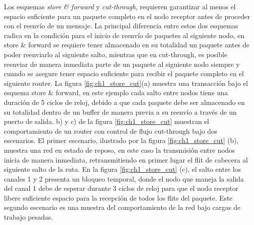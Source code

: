 Los esquemas \textit{store \& forward} y \textit{cut-through}, requieren garantizar al menos el espacio suficiente para un paquete completo en el nodo receptor antes de proceder con el reenvío de un mensaje. La principal diferencia entre estos dos esquemas radica en la condición para el inicio de reenvío de paquetes al siguiente nodo, en store \& forward se requiere tener almacenado en su totalidad un paquete antes de poder reenviarlo al siguiente salto, mientras que en cut-through, es posible reenviar de manera inmediata parte de un paquete al siguiente nodo siempre y cuando se asegure tener espacio suficiente para recibir el paquete completo en el siguiente router. La figura \ref{fig:ch1_store_cut}(a) muestra una transacción bajo el esquema store \& forward, en este ejemplo cada salto entre nodos tiene una duración de 5 ciclos de reloj, debido a que cada paquete debe ser almacenado en su totalidad dentro de un buffer de manera previa a su reenvío a través de un puerto de salida.  b) y c) de la figura \ref{fig:ch1_store_cut} muestran el comportamiento de un router con control de flujo cut-through bajo dos escenarios. El primer escenario, ilustrado por la figura \ref{fig:ch1_store_cut} (b), muestra una red en estado de reposo, en este caso la transmisión entre nodos inicia de manera inmediata, retransmitiendo en primer lugar el flit de cabecera al siguiente salto de la ruta. En la figura \ref{fig:ch1_store_cut} (c), el salto entre los canales 1 y 2 presenta un bloqueo temporal, donde el nodo que maneja la salida del canal 1 debe de esperar durante 3 ciclos de reloj para que el nodo receptor libere suficiente espacio para la recepción de todos los flits del paquete. Este segundo escenario es una muestra del comportamiento de la red bajo cargas de trabajo pesadas.

